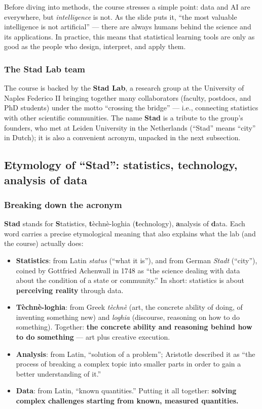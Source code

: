 Before diving into methods, the course stresses a simple point: data and AI are everywhere, but \textit{intelligence} is not. As the slide puts it, ``the most valuable intelligence is not artificial'' --- there are always humans behind the science and its applications. In practice, this means that statistical learning tools are only as good as the people who design, interpret, and apply them.

\subsubsection{The Stad Lab team}

The course is backed by the \textbf{Stad Lab}, a research group at the University of Naples Federico II bringing together many collaborators (faculty, postdocs, and PhD students) under the motto ``crossing the bridge'' --- i.e., connecting statistics with other scientific communities. The name \textbf{Stad} is a tribute to the group's founders, who met at Leiden University in the Netherlands (``Stad'' means ``city'' in Dutch); it is also a convenient acronym, unpacked in the next subsection.

\subsection{Etymology of ``Stad'': statistics, technology, analysis of data}\label{sec:prolusion-etymology}

\subsubsection{Breaking down the acronym}

\textbf{Stad} stands for \textbf{S}tatistics, \textbf{t}\`echn\`e-loghia (\textbf{t}echnology), \textbf{a}nalysis of \textbf{d}ata. Each word carries a precise etymological meaning that also explains what the lab (and the course) actually does:

\begin{itemize}
  \item \textbf{Statistics}: from Latin \textit{status} (``what it is''), and from German \textit{Stadt} (``city''), coined by Gottfried Achenwall in 1748 as ``the science dealing with data about the condition of a state or community.'' In short: statistics is about \textbf{perceiving reality} through data.
  \item \textbf{T\`echn\`e-loghia}: from Greek \textit{t\`echn\`e} (art, the concrete ability of doing, of inventing something new) and \textit{loghia} (discourse, reasoning on how to do something). Together: \textbf{the concrete ability and reasoning behind how to do something} --- art plus creative execution.
  \item \textbf{Analysis}: from Latin, ``solution of a problem''; Aristotle described it as ``the process of breaking a complex topic into smaller parts in order to gain a better understanding of it.''
  \item \textbf{Data}: from Latin, ``known quantities.'' Putting it all together: \textbf{solving complex challenges starting from known, measured quantities.}
\end{itemize}

